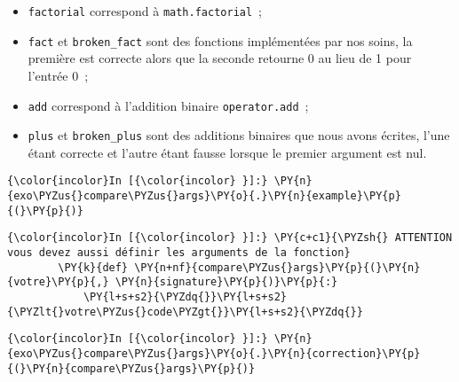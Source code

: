 \begin{itemize}
	\item 
	\texttt{factorial} correspond à \texttt{math.factorial}~;
	\item
	\texttt{fact} et
	\texttt{broken\_fact} sont des fonctions implémentées par nos soins, la
	première est correcte alors que la seconde retourne 0 au lieu de 1 pour
	l'entrée 0~;
	\item
	\texttt{add} correspond à l'addition binaire \texttt{operator.add}~;
	\item
	\texttt{plus} et \texttt{broken\_plus} sont
	des additions binaires que nous avons écrites, l'une étant correcte et
	l'autre étant fausse lorsque le premier argument est nul.
\end{itemize}

    \begin{Verbatim}[commandchars=\\\{\}]
{\color{incolor}In [{\color{incolor} }]:} \PY{n}{exo\PYZus{}compare\PYZus{}args}\PY{o}{.}\PY{n}{example}\PY{p}{(}\PY{p}{)}
\end{Verbatim}


    \begin{Verbatim}[commandchars=\\\{\}]
{\color{incolor}In [{\color{incolor} }]:} \PY{c+c1}{\PYZsh{} ATTENTION vous devez aussi définir les arguments de la fonction}
        \PY{k}{def} \PY{n+nf}{compare\PYZus{}args}\PY{p}{(}\PY{n}{votre}\PY{p}{,} \PY{n}{signature}\PY{p}{)}\PY{p}{:}
            \PY{l+s+s2}{\PYZdq{}}\PY{l+s+s2}{\PYZlt{}votre\PYZus{}code\PYZgt{}}\PY{l+s+s2}{\PYZdq{}}
\end{Verbatim}


    \begin{Verbatim}[commandchars=\\\{\}]
{\color{incolor}In [{\color{incolor} }]:} \PY{n}{exo\PYZus{}compare\PYZus{}args}\PY{o}{.}\PY{n}{correction}\PY{p}{(}\PY{n}{compare\PYZus{}args}\PY{p}{)}
\end{Verbatim}